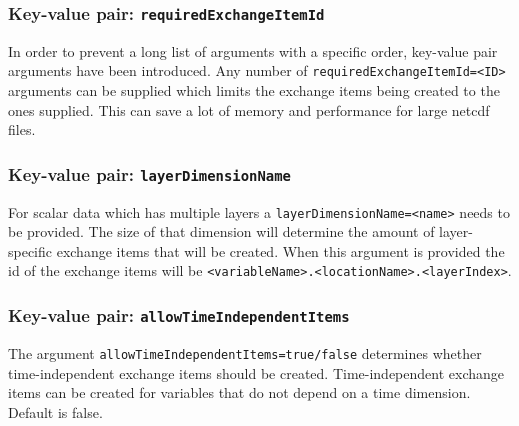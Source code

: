 \subsubsection{Key-value pair: \texttt{requiredExchangeItemId}}
In order to prevent a long list of arguments with a specific order, key-value pair arguments have been introduced.
Any number of \verb|requiredExchangeItemId=<ID>| arguments can be supplied which limits the exchange items being created to the ones supplied.
This can save a lot of memory and performance for large netcdf files.

\subsubsection{Key-value pair: \texttt{layerDimensionName}}
For scalar data which has multiple layers a \verb|layerDimensionName=<name>| needs to be provided. 
The size of that dimension will determine the amount of layer-specific exchange items that will be created.
When this argument is provided the id of the exchange items will be \verb|<variableName>.<locationName>.<layerIndex>|.

\subsubsection{Key-value pair: \texttt{allowTimeIndependentItems}}
The argument \verb|allowTimeIndependentItems=true/false| determines whether time-independent exchange items should be created.
Time-independent exchange items can be created for variables that do not depend on a time dimension.
Default is false.

